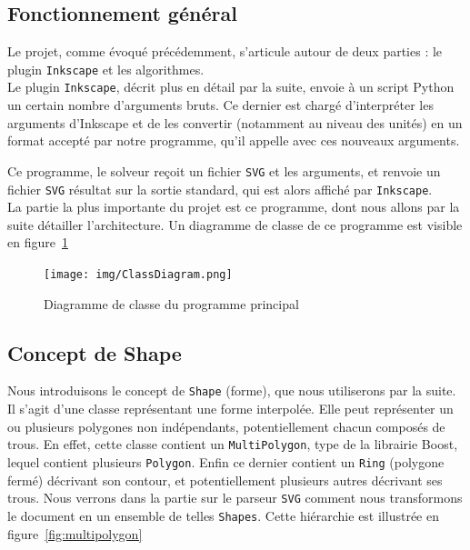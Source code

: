 \subsection{Fonctionnement général}
Le projet, comme évoqué précédemment, s'articule autour de deux parties : le plugin \texttt{Inkscape} et les algorithmes.\\

Le plugin \texttt{Inkscape}, décrit plus en détail par la suite, envoie à un script Python un certain nombre d'arguments bruts. Ce dernier est chargé d'interpréter les arguments d'Inkscape et de les convertir (notamment au niveau des unités) en un format accepté par notre programme, qu'il appelle avec ces nouveaux arguments.

Ce programme, le solveur reçoit un fichier \texttt{SVG} et les arguments, et renvoie un fichier  \texttt{SVG} résultat sur la sortie standard, qui est alors affiché par \texttt{Inkscape}.\\

La partie la plus importante du projet est ce programme, dont nous allons par la suite détailler l'architecture. Un diagramme de classe de ce programme est visible en figure~\ref{fig:diagramme}

\begin{figure}[!htb]
\centering
\texttt{[image: img/ClassDiagram.png]}
\caption{Diagramme de classe du programme principal}
\label{fig:diagramme}
\end{figure}

\subsection{Concept de Shape}

Nous introduisons le concept de \texttt{Shape} (forme), que nous utiliserons par la suite. Il s'agit d'une classe représentant une forme interpolée. Elle peut représenter un ou plusieurs polygones non indépendants, potentiellement chacun composés de trous. En effet, cette classe contient un \texttt{MultiPolygon}, type de la librairie Boost, lequel contient plusieurs \texttt{Polygon}. Enfin ce dernier contient un \texttt{Ring} (polygone fermé) décrivant son contour, et potentiellement plusieurs autres décrivant ses trous. Nous verrons dans la partie sur le parseur \texttt{SVG} comment nous transformons le document en un ensemble de telles \texttt{Shapes}. Cette hiérarchie est illustrée en figure~\ref{fig:multipolygon}\\

